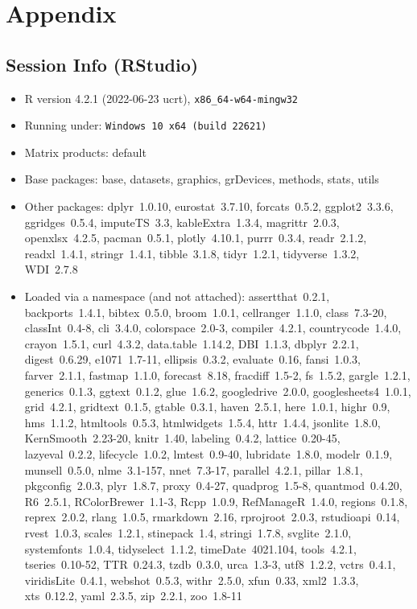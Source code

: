 \documentclass[
  12pt,
]{article}
\numberwithin{equation}{section}
\numberwithin{table}{section}
\numberwithin{figure}{section}
\begin{document}
\appendix
\section*{Appendix}
\renewcommand{\thesubsection}{\Alph{subsection}}
\newcommand{\subsectionbreak}{\clearpage\phantomsection}

\normalsize

\hypertarget{session-info-rstudio}{%
\subsection{Session Info (RStudio)}\label{session-info-rstudio}}

\footnotesize

\begin{itemize}\raggedright
  \item R version 4.2.1 (2022-06-23 ucrt), \verb|x86_64-w64-mingw32|
  \item Running under: \verb|Windows 10 x64 (build 22621)|
  \item Matrix products: default
  \item Base packages: base, datasets, graphics, grDevices, methods,
    stats, utils
  \item Other packages: dplyr~1.0.10, eurostat~3.7.10, forcats~0.5.2,
    ggplot2~3.3.6, ggridges~0.5.4, imputeTS~3.3, kableExtra~1.3.4,
    magrittr~2.0.3, openxlsx~4.2.5, pacman~0.5.1, plotly~4.10.1,
    purrr~0.3.4, readr~2.1.2, readxl~1.4.1, stringr~1.4.1,
    tibble~3.1.8, tidyr~1.2.1, tidyverse~1.3.2, WDI~2.7.8
  \item Loaded via a namespace (and not attached): assertthat~0.2.1,
    backports~1.4.1, bibtex~0.5.0, broom~1.0.1, cellranger~1.1.0,
    class~7.3-20, classInt~0.4-8, cli~3.4.0, colorspace~2.0-3,
    compiler~4.2.1, countrycode~1.4.0, crayon~1.5.1, curl~4.3.2,
    data.table~1.14.2, DBI~1.1.3, dbplyr~2.2.1, digest~0.6.29,
    e1071~1.7-11, ellipsis~0.3.2, evaluate~0.16, fansi~1.0.3,
    farver~2.1.1, fastmap~1.1.0, forecast~8.18, fracdiff~1.5-2,
    fs~1.5.2, gargle~1.2.1, generics~0.1.3, ggtext~0.1.2, glue~1.6.2,
    googledrive~2.0.0, googlesheets4~1.0.1, grid~4.2.1, gridtext~0.1.5,
    gtable~0.3.1, haven~2.5.1, here~1.0.1, highr~0.9, hms~1.1.2,
    htmltools~0.5.3, htmlwidgets~1.5.4, httr~1.4.4, jsonlite~1.8.0,
    KernSmooth~2.23-20, knitr~1.40, labeling~0.4.2, lattice~0.20-45,
    lazyeval~0.2.2, lifecycle~1.0.2, lmtest~0.9-40, lubridate~1.8.0,
    modelr~0.1.9, munsell~0.5.0, nlme~3.1-157, nnet~7.3-17,
    parallel~4.2.1, pillar~1.8.1, pkgconfig~2.0.3, plyr~1.8.7,
    proxy~0.4-27, quadprog~1.5-8, quantmod~0.4.20, R6~2.5.1,
    RColorBrewer~1.1-3, Rcpp~1.0.9, RefManageR~1.4.0, regions~0.1.8,
    reprex~2.0.2, rlang~1.0.5, rmarkdown~2.16, rprojroot~2.0.3,
    rstudioapi~0.14, rvest~1.0.3, scales~1.2.1, stinepack~1.4,
    stringi~1.7.8, svglite~2.1.0, systemfonts~1.0.4, tidyselect~1.1.2,
    timeDate~4021.104, tools~4.2.1, tseries~0.10-52, TTR~0.24.3,
    tzdb~0.3.0, urca~1.3-3, utf8~1.2.2, vctrs~0.4.1, viridisLite~0.4.1,
    webshot~0.5.3, withr~2.5.0, xfun~0.33, xml2~1.3.3, xts~0.12.2,
    yaml~2.3.5, zip~2.2.1, zoo~1.8-11
\end{itemize}

\normalsize
\singlespacing
\listoffigures
\listoftables

\def\bibpreamble{All online resources were last accessed on 12 December 2022.}
\footnotesize

  
\end{document}
